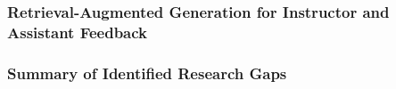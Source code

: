 \subsubsection{Retrieval-Augmented Generation for Instructor and Assistant Feedback}

\subsubsection{Summary of Identified Research Gaps}

